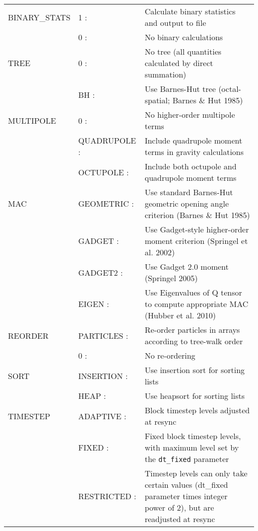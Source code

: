 \documentclass[a4paper]{article}
\newcommand{\var}[1]{\texttt{#1}}
\begin{document}
\begin{center}
\begin{supertabular}{|p{4.6cm}|p{4.6cm} p{6.4cm}|}
 BINARY\_STATS & 1 :& Calculate binary statistics and output to file \\
               & 0 :& No binary calculations \\ \hline

 TREE          & 0      :& No tree (all quantities calculated by direct summation) \\
	       & BH     :& Use Barnes-Hut tree (octal-spatial; Barnes \& Hut 1985) \\ \hline

 MULTIPOLE     & 0  :& No higher-order multipole terms \\
               & QUADRUPOLE :& Include quadrupole moment terms in gravity calculations \\
               & OCTUPOLE :& Include both octupole and quadrupole moment terms \\ \hline

 MAC           & GEOMETRIC :& Use standard Barnes-Hut geometric opening angle criterion (Barnes \& Hut 1985) \\
               & GADGET    :& Use Gadget-style higher-order moment criterion (Springel et al. 2002) \\
               & GADGET2   :& Use Gadget 2.0 moment (Springel 2005) \\
               & EIGEN     :& Use Eigenvalues of Q tensor to compute appropriate MAC (Hubber et al. 2010)\\ \hline

 REORDER       & PARTICLES  :& Re-order particles in arrays according to tree-walk order  \\
               & 0   :& No re-ordering \\ \hline

 SORT          & INSERTION :& Use insertion sort for sorting lists \\
               & HEAP      :& Use heapsort for sorting lists\\ \hline

 TIMESTEP      & ADAPTIVE   :& Block timestep levels adjusted at resync \\
               & FIXED      :& Fixed block timestep levels, with maximum level set by the \var{dt\_fixed} parameter\\ 
               & RESTRICTED :& Timestep levels can only take certain values
                 (dt\_fixed parameter times integer power of 2), but are readjusted at resync \\ \hline


\end{supertabular}
\end{center}
\end{document}
